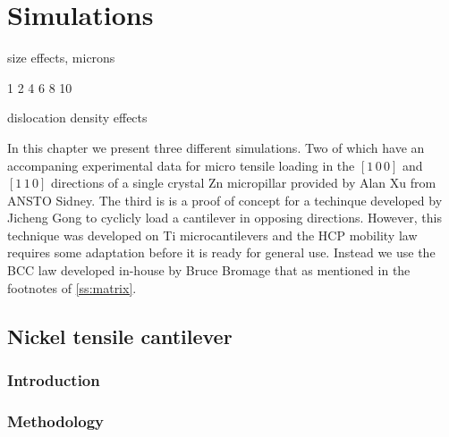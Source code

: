 \chapter{Simulations}\label{c:simulations}

size effects, microns

1
2
4
6
8
10

dislocation density effects


In this chapter we present three different simulations. Two of which have an accompaning experimental data for micro tensile loading in the $[1\, 0\, 0]$ and $[1\, 1\, 0]$ directions of a single crystal Zn micropillar provided by Alan Xu from ANSTO Sidney. The third is is a proof of concept for a techinque developed by Jicheng Gong to cyclicly load a cantilever in opposing directions. However, this technique was developed on Ti microcantilevers and the HCP mobility law requires some adaptation before it is ready for general use. Instead we use the BCC law developed in-house by Bruce Bromage that as mentioned in the footnotes of \cref{ss:matrix}.

\section{Nickel tensile cantilever}\label{s:nickelTensile}
\subsection{Introduction}
\subsection{Methodology}

